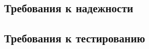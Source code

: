 \headingtextsep

\underline{\hspace{\textwidth}}

\underline{\hspace{\textwidth}}

\underline{\hspace{\textwidth}}

\textheadingsep
\subsection{Требования к надежности}

\headingtextsep

\underline{\hspace{\textwidth}}

\underline{\hspace{\textwidth}}

\underline{\hspace{\textwidth}}

\textheadingsep
\subsection{Требования к тестированию}

\headingtextsep

\underline{\hspace{\textwidth}}

\subsubsection{\underline{\hspace{8cm}}}

\underline{\hspace{\textwidth}}

\subsubsection{\underline{\hspace{8cm}}}

\underline{\hspace{\textwidth}}

\subsubsection{\underline{\hspace{8cm}}}

\underline{\hspace{\textwidth}}

